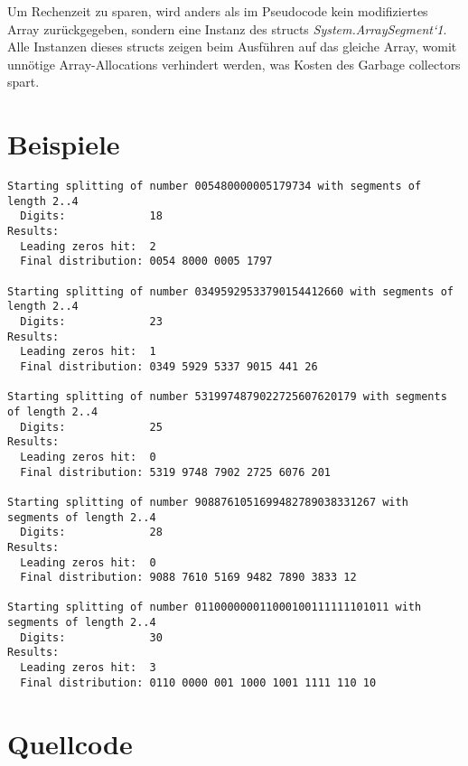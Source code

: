 \documentclass[12pt]{article}
\begin{document}
Um Rechenzeit zu sparen, wird anders als im Pseudocode kein modifiziertes Array zurückgegeben, sondern eine Instanz des structs \textit{System.ArraySegment`1}. Alle Instanzen dieses structs zeigen beim Ausführen auf das gleiche Array, womit unnötige Array-Allocations verhindert werden, was Kosten des Garbage collectors spart.

\section{Beispiele}

\begin{lstlisting}
Starting splitting of number 005480000005179734 with segments of length 2..4
  Digits:             18
Results:
  Leading zeros hit:  2
  Final distribution: 0054 8000 0005 1797

Starting splitting of number 03495929533790154412660 with segments of length 2..4
  Digits:             23
Results:
  Leading zeros hit:  1
  Final distribution: 0349 5929 5337 9015 441 26

Starting splitting of number 5319974879022725607620179 with segments of length 2..4
  Digits:             25
Results:
  Leading zeros hit:  0
  Final distribution: 5319 9748 7902 2725 6076 201

Starting splitting of number 9088761051699482789038331267 with segments of length 2..4
  Digits:             28
Results:
  Leading zeros hit:  0
  Final distribution: 9088 7610 5169 9482 7890 3833 12

Starting splitting of number 011000000011000100111111101011 with segments of length 2..4
  Digits:             30
Results:
  Leading zeros hit:  3
  Final distribution: 0110 0000 001 1000 1001 1111 110 10
\end{lstlisting}

\section{Quellcode}
\end{document}
